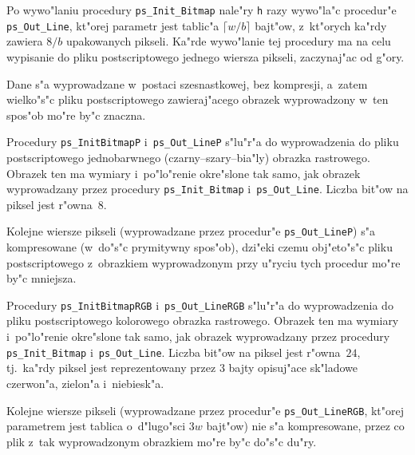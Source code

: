 Po wywo"laniu procedury \texttt{ps\_Init\_Bitmap} nale"ry \texttt{h} razy
wywo"la"c procedur"e \texttt{ps\_Out\_Line}, kt"orej parametr jest tablic"a
$\lceil w/b\rceil$ bajt"ow, z~kt"orych ka"rdy zawiera $8/b$ upakowanych
pikseli. Ka"rde wywo"lanie tej procedury ma na celu wypisanie do pliku
postscriptowego jednego wiersza pikseli, zaczynaj"ac od g"ory.

Dane s"a wyprowadzane w~postaci szesnastkowej, bez kompresji, a~zatem
wielko"s"c pliku postscriptowego zawieraj"acego obrazek wyprowadzony w~ten
spos"ob mo"re by"c znaczna.

\vspace{\bigskipamount}
Procedury \texttt{ps\_InitBitmapP} i~\texttt{ps\_Out\_LineP} s"lu"r"a do
wyprowadzenia do pliku postscriptowego jednobarwnego (czarny--szary--bia"ly)
obrazka rastrowego. Obrazek ten ma wymiary i~po"lo"renie okre"slone tak
samo, jak obrazek wyprowadzany przez procedury \texttt{ps\_Init\_Bitmap}
i~\texttt{ps\_Out\_Line}. Liczba bit"ow na piksel jest r"owna~$8$.

Kolejne wiersze pikseli (wyprowadzane przez procedur"e
\texttt{ps\_Out\_LineP}) s"a kompresowane (w~do"s"c prymitywny spos"ob),
dzi"eki czemu obj"eto"s"c pliku postscriptowego z~obrazkiem wyprowadzonym
przy u"ryciu tych procedur mo"re by"c mniejsza.

\vspace{\bigskipamount}
\begin{sloppypar}
Procedury \texttt{ps\_InitBitmapRGB} i~\texttt{ps\_Out\_LineRGB} s"lu"r"a do
wyprowadzenia do pliku postscriptowego kolorowego
obrazka rastrowego. Obrazek ten ma wymiary i~po"lo"renie okre"slone tak
samo, jak obrazek wyprowadzany przez procedury \texttt{ps\_Init\_Bitmap}
i~\texttt{ps\_Out\_Line}. Liczba bit"ow na piksel jest r"owna~$24$, tj.\
ka"rdy piksel jest reprezentowany przez $3$ bajty opisuj"ace sk"ladowe
czerwon"a, zielon"a i~niebiesk"a.
\end{sloppypar}

Kolejne wiersze pikseli (wyprowadzane przez procedur"e
\texttt{ps\_Out\_LineRGB}, kt"orej parametrem jest tablica o~d"lugo"sci $3w$
bajt"ow) nie s"a kompresowane, przez co plik z~tak wyprowadzonym obrazkiem
mo"re by"c do"s"c du"ry.

